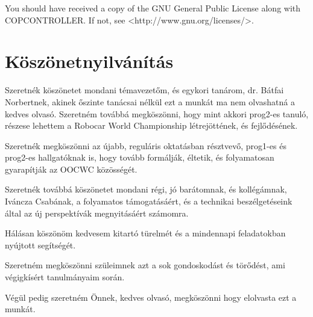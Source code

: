 \documentclass[a4paper,12pt]{report}
\begin{document}
\noindent
You should have received a copy of the GNU General Public License
along with COPCONTROLLER. If not, see <http://www.gnu.org/licenses/>.

\chapter*{Köszönetnyilvánítás}

Szeretnék köszönetet mondani témavezetőm, és egykori tanárom, dr. Bátfai Norbertnek, akinek őszinte tanácsai nélkül ezt a munkát ma nem olvashatná a kedves olvasó. Szeretném továbbá megköszönni, hogy mint akkori prog2-es tanuló, részese lehettem a Robocar World Championship létrejöttének, és fejlődésének.

Szeretnék megköszönni az újabb, reguláris oktatásban résztvevő, prog1-es és prog2-es hallgatóknak is, hogy tovább formálják, éltetik, és folyamatosan gyarapítják az OOCWC közösségét.

Szeretnék továbbá köszönetet mondani régi, jó barátomnak, és kollégámnak, Iváncza Csabának, a folyamatos támogatásáért, és a technikai beszélgetéseink által az új perspektívák megnyitásáért számomra.

Hálásan köszönöm kedvesem kitartó türelmét és a mindennapi feladatokban nyújtott segítségét.

Szeretném megköszönni szüleimnek azt a sok gondoskodást és törődést, ami végigkísért tanulmányaim során.

Végül pedig szeretném Önnek, kedves olvasó, megköszönni hogy elolvasta ezt a munkát.
\end{document}

